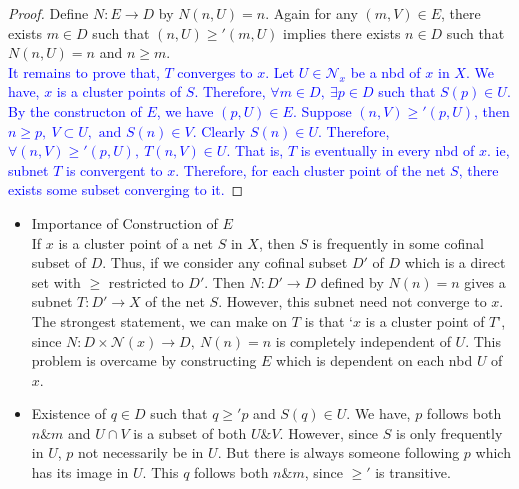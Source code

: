 \begin{proof}
	Define $N : E \to D$ by $N(n,U) = n$.
	Again for any $(m,V) \in E$, there exists $m \in D$ such that $(n,U) \ge' (m,U)$ implies there exists $n \in D$ such that  $N(n,U) = n$ and $n \ge m$.\\
	
	\textcolor{blue}{It remains to prove that, $T$ converges to $x$.
	Let $U \in \mathcal{N}_x$ be a nbd of $x$ in $X$.
	We have, $x$ is a cluster points of $S$.
	Therefore, $\forall m \in D,\ \exists p \in D$ such that $S(p) \in U$.
	By the constructon of $E$, we have $(p,U) \in E$.
	Suppose $(n,V) \ge' (p,U)$, then $n \ge p,\ V \subset U, \text{ and } S(n) \in V$.
	Clearly $S(n) \in U$.
	Therefore, $\forall (n,V) \ge' (p,U),\ T(n,V) \in U$.
	That is, $T$ is eventually in every nbd of $x$.
	ie, subnet $T$ is convergent to $x$.
	Therefore, for each cluster point of the net $S$, there exists some subset converging to it.}
\end{proof}

\begin{remark}
\begin{commentary}
	\begin{itemize}
		\item  Importance of Construction of $E$\\ If $x$ is a cluster point of a net $S$ in $X$, then $S$ is frequently in some cofinal subset of $D$.
			Thus, if we consider any cofinal subset $D'$ of $D$ which is a direct set with $\ge$ restricted to $D'$.
			Then $N : D' \to D$ defined by $N(n)=n$ gives a subnet $T : D' \to X$ of the net $S$.
			However, this subnet need not converge to $x$.
			The strongest statement, we can make on $T$ is that `$x$ is a cluster point of $T$', since $N : D \times \mathcal{N}(x) \to D,\ N(n) = n$ is completely independent of $U$. This problem is overcame by constructing $E$ which is dependent on each nbd $U$ of $x$.
		\item Existence of $q \in D$ such that $q \ge' p$ and $S(q) \in U$.
			We have, $p$ follows both $n \& m$ and $U \cap V$ is a subset of both $U \& V$.
			However, since $S$ is only frequently in $U$, $p$ not necessarily be in $U$.
			But there is always someone following $p$ which has its image in $U$.
			This $q$ follows both $n \& m$, since $\ge'$ is transitive.
	\end{itemize}
\end{commentary}
\end{remark}


